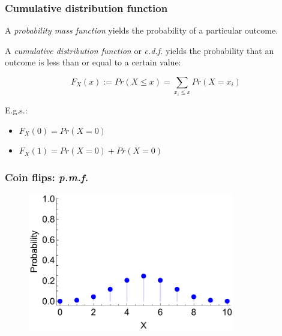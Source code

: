 \documentclass{beamer}
\begin{document}
	\begin{frame}
		\frametitle{Cumulative distribution function}
		
		A \textit{probability mass function} yields the probability of a particular outcome.
		
		\vspace{0.5cm}
		
		A \textit{cumulative distribution function} or \textit{c.d.f.} yields the probability that an outcome is less than or equal to a certain value:
		
		\begin{equation}
		F_X(x) := Pr(X\leq x) = \sum_{x_i \leq x} Pr(X = x_i)
		\end{equation}
		
		E.g.s.:
		
		\begin{itemize}
			\item $F_X(0) = Pr(X=0)$
			\item $F_X(1) = Pr(X=0) + Pr(X=0)$
		\end{itemize}
		
	\end{frame}
	
	\begin{frame}
		\frametitle{Coin flips: \textit{p.m.f.}}
		
		\begin{figure}[ht]
			\includegraphics[width=0.8\textwidth]{./figures/binomial_cdf_1.pdf}
		\end{figure}
		
	\end{frame}
	
\end{document}
